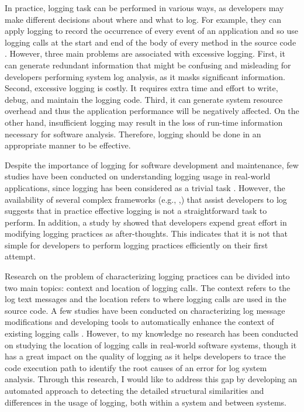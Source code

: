 In practice, logging task can be performed in various ways, as developers may make different decisions about where and what to log. For example, they can apply logging to record the occurrence of every event of an application and so use logging calls at the start and end of the body of every method in the source code \cite{clarke1999dimension,clarke1999subject}. However, three main problems are associated with excessive logging. First, it can generate redundant information that might be confusing and misleading for developers performing system log analysis, as it masks significant information. Second, excessive logging is costly. It requires extra time and effort to write, debug, and maintain the logging code. Third, it can generate system resource overhead and thus the application performance will be negatively affected. On the other hand, insufficient logging may result in the loss of run-time information necessary for software analysis. Therefore, logging should be done in an appropriate manner to be effective.

Despite the importance of logging for software development and maintenance, few studies have been conducted on understanding logging usage in real-world applications, since logging has been considered as a trivial task \cite{clarke1999dimension,clarke1999subject}. However, the availability of several complex frameworks (e.g., ,) that assist developers to log suggests that in practice effective logging is not a straightforward task to perform. In addition, a study by \citet{yuan2012characterizing} showed that developers expend great effort in modifying logging practices as after-thoughts. This indicates that it is not that simple for developers to perform logging practices efficiently on their first attempt.

Research on the problem of characterizing logging practices can be divided into two main topics: context and location of logging calls. The context refers to the log text messages and the location refers to where logging calls are used in the source code. A few studies have been conducted on characterizing log message modifications \cite{yuan2012characterizing} and developing tools to automatically enhance the context of existing logging calls \cite{yuan2012improving, yuan2010sherlog}. However, to my knowledge no research has been conducted on studying the location of logging calls in real-world software systems, though it has a great impact on the quality of logging as it helps developers to trace the code execution path to identify the root causes of an error for log system analysis. Through this research, I would like to address this gap by developing an automated approach to detecting the detailed structural similarities and differences in the usage of logging, both within a system and between systems.


